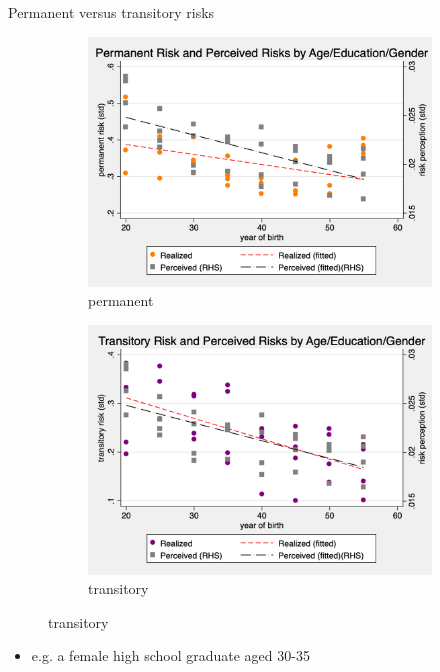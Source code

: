 \documentclass{beamer}
\begin{document}
\begin{frame}{Permanent versus transitory risks } 
	\label{appendix:monthly_decomposition_compare_psid}
	\begin{figure}[ht]
		\centering
		\begin{subfigure}[b]{0.44\textwidth}
			\caption{permanent}
			\includegraphics[width=\textwidth]{figures/log_wage_pshk_by_age_5yr_edu_gender_compare.png}
		\end{subfigure}
		\begin{subfigure}[b]{0.44\textwidth}
			\caption{transitory}
			\includegraphics[width=\textwidth]{figures/log_wage_tshk_by_age_5yr_edu_gender_compare.png}
		\end{subfigure} 
	\end{figure}
	\begin{itemize}
		\item e.g. a female high school graduate aged 30-35
		\quad  \hyperlink{appendix:cohort_age_component_compare}{}  
	\end{itemize}
	\hyperlink{monthly_decomposition_compare}{} 
\end{frame}
\end{document}
